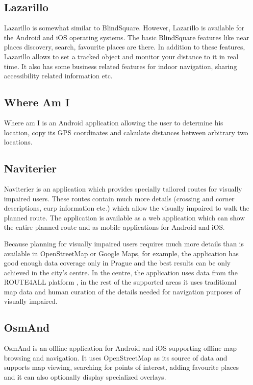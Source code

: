 \documentclass[nolof,digital]{fithesis3}
\begin{document}
\subsection{Lazarillo}
Lazarillo \parencite{lazarillo} is somewhat similar to BlindSquare. However, Lazarillo is available for the Android and iOS operating systems. The basic BlindSquare features like near places discovery, search, favourite places are there. In addition to these features, Lazarillo allows to set a tracked object and monitor your distance to it in real time. It also has some business related features for indoor navigation, sharing accessibility related information etc.
\subsection{Where Am I}
Where am I \parencite{whereami} is an Android application allowing the user to determine his location, copy its GPS coordinates and calculate distances between arbitrary two locations.
\subsection{Naviterier}
Naviterier \parencite{naviterier} is an application which provides specially tailored routes for visually impaired users. These routes contain much more details (crossing and corner descriptions, curp information etc.) which allow the visually impaired to walk the planned route. The application is available as a web application which can show the entire planned route and as mobile applications for Android and iOS.

Because planning for visually impaired users requires much more details than is available in OpenStreetMap or Google Maps, for example, the application has good enough data coverage only in Prague and the best results can be only achieved in the city's centre. In the centre, the application uses data from the ROUTE4ALL platform \parencite{route4all}, in the rest of the supported areas it uses traditional map data and human curation of the details needed for navigation purposes of visually impaired.
\subsection{OsmAnd}
OsmAnd \parencite{osmand} is an offline application for Android and iOS supporting offline map browsing and navigation. It uses OpenStreetMap as its source of data and supports map viewing, searching for points of interest, adding favourite places and it can also optionally display specialized overlays.
\end{document}
